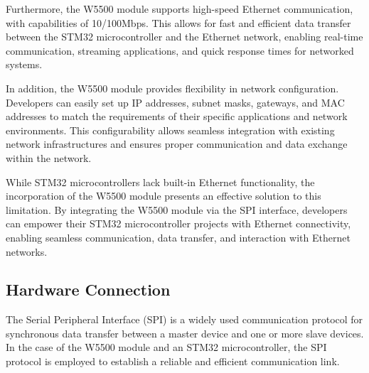 \documentclass[
12pt,
oneside, 
onehalfspacing, 
nolistspacing, 
parskip, 
chapterinoneline, 
]{AASTCOMPUTER}
\begin{document}
Furthermore, the W5500 module supports high-speed Ethernet communication, with capabilities of 10/100Mbps. This allows for fast and efficient data transfer between the STM32 microcontroller and the Ethernet network, enabling real-time communication, streaming applications, and quick response times for networked systems.

In addition, the W5500 module provides flexibility in network configuration. Developers can easily set up IP addresses, subnet masks, gateways, and MAC addresses to match the requirements of their specific applications and network environments. This configurability allows seamless integration with existing network infrastructures and ensures proper communication and data exchange within the network.

While STM32 microcontrollers lack built-in Ethernet functionality, the incorporation of the W5500 module presents an effective solution to this limitation. By integrating the W5500 module via the SPI interface, developers can empower their STM32 microcontroller projects with Ethernet connectivity, enabling seamless communication, data transfer, and interaction with Ethernet networks.

\subsection{Hardware Connection}

The Serial Peripheral Interface (SPI) is a widely used communication protocol for synchronous data transfer between a master device and one or more slave devices. In the case of the W5500 module and an STM32 microcontroller, the SPI protocol is employed to establish a reliable and efficient communication link.
\end{document}
